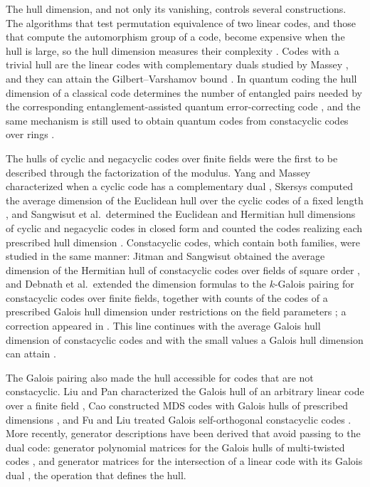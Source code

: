 \documentclass[10pt,a4paper]{article}
\numberwithin{equation}{section}
\theoremstyle{plain}
\theoremstyle{definition}
\theoremstyle{remark}
\begin{document}
The hull dimension, and not only its vanishing, controls several constructions.
The algorithms that test permutation equivalence of two linear codes, and those
that compute the automorphism group of a code, become expensive when the hull is
large, so the hull dimension measures their complexity \cite{sendrier1997}.
Codes with a trivial hull are the linear codes with complementary duals studied
by Massey \cite{massey1992}, and they can attain the Gilbert--Varshamov bound
\cite{sendrier2004}. In quantum coding the hull
dimension of a classical code determines the number of entangled pairs needed by
the corresponding entanglement-assisted quantum error-correcting code
\cite{brun2006,wildeBrun2008}, and the same mechanism is still used to obtain
quantum codes from constacyclic codes over rings \cite{zhang2026}.

The hulls of cyclic and negacyclic codes over finite fields were the first to be
described through the factorization of the modulus. Yang and Massey
characterized when a cyclic code has a complementary dual \cite{yangMassey1994},
Skersys computed the average dimension of the Euclidean hull over the cyclic
codes of a fixed length \cite{skersys2003}, and Sangwisut et al.\ determined the
Euclidean and Hermitian hull dimensions of cyclic and negacyclic codes in closed
form and counted the codes realizing each prescribed hull dimension
\cite{sangwisut2015}. Constacyclic codes, which contain both families, were
studied in the same manner: Jitman and Sangwisut obtained the average dimension
of the Hermitian hull of constacyclic codes over fields of square order
\cite{jitmanSangwisut2018}, and Debnath et al.\ extended the dimension formulas
to the $k$-Galois pairing for constacyclic codes over finite fields, together
with counts of the codes of a prescribed Galois hull dimension under
restrictions on the field parameters \cite{debnathConstacyclic2023}; a correction
appeared in \cite{debnathCorrection2023}. This line continues with the average
Galois hull dimension of constacyclic codes \cite{debnathAverage2025} and with
the small values a Galois hull dimension can attain \cite{debnathSmall2026}.

The Galois pairing also made the hull accessible for codes that are not
constacyclic. Liu and Pan characterized the Galois hull of an arbitrary linear
code over a finite field \cite{liuPan2020}, Cao constructed MDS codes with
Galois hulls of prescribed dimensions \cite{cao2021}, and Fu and Liu treated
Galois self-orthogonal constacyclic codes \cite{fuLiu2022}. More recently,
generator descriptions have been derived that avoid passing to the dual code:
generator polynomial matrices for the Galois hulls of multi-twisted codes
\cite{eldinSole2026}, and generator matrices for the intersection of a linear
code with its Galois dual \cite{eldinLeroy2026}, the operation that defines the
hull.
\end{document}
